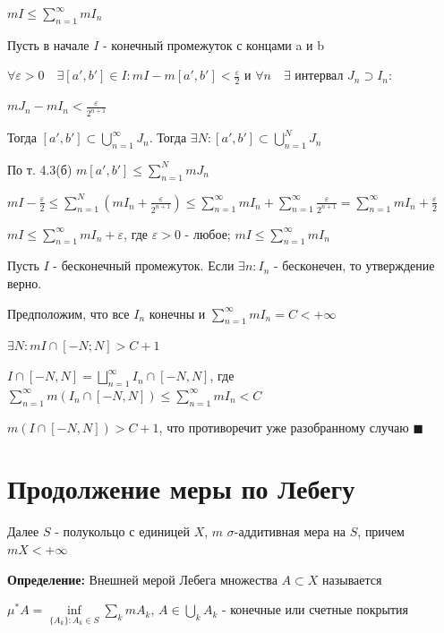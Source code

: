 \documentclass[a4paper]{report}
\begin{document}
$mI\le\sum\limits_{n=1}^\infty mI_n$

Пусть в начале $I$ - конечный промежуток с концами a и b

$\forall\varepsilon>0\quad\exists[a',b']\in I\colon mI-m[a',b']<\frac\varepsilon2$ и $\forall n\quad\exists$ интервал
$J_n\supset I_n\colon$

$mJ_n-mI_n<\displaystyle\frac{\varepsilon}{2^{n+1}}$

Тогда $[a',b']\subset\bigcup\limits_{n=1}^\infty J_n$. Тогда $\exists N\colon[a',b']\subset\bigcup\limits_{n=1}^N J_n$

По т. 4.3(б) $m[a',b']\le\sum\limits_{n=1}^N mJ_n$

$mI-\frac\varepsilon2\le\sum\limits_{n=1}^N\left(mI_n+\displaystyle\frac{\varepsilon}{2^{n+1}}\right)\le\sum\limits_{n=1}^\infty mI_n
+\sum\limits_{n=1}^\infty\displaystyle\frac{\varepsilon}{2^{n+1}}=\sum\limits_{n=1}^\infty mI_n+\frac\varepsilon2$

$mI\le\sum\limits_{n=1}^\infty mI_n+\varepsilon$, где $\varepsilon>0$ - любое; $mI\le\sum\limits_{n=1}^\infty mI_n$

Пусть $I$ - бесконечный промежуток. Если $\exists n\colon I_n$ - бесконечен, то утверждение верно.

Предположим, что все $I_n$ конечны и $\sum\limits_{n=1}^\infty mI_n=C<+\infty$

$\exists N\colon mI\cap[-N;N]>C+1$

$I\cap[-N,N]=\bigsqcup\limits_{n=1}^\infty I_n\cap[-N,N]$, где $\sum\limits_{n=1}^\infty m\left(I_n\cap[-N,N]\right)\le
\sum\limits_{n=1}^\infty mI_n<C$

 $m\left(I\cap[-N,N]\right)>C+1$, что противоречит уже разобранному случаю $\blacksquare$









\chapter{Продолжение меры по Лебегу}

Далее $S$ - полукольцо с единицей $X$, $m$ $\sigma$-аддитивная мера на $S$, причем $mX<+\infty$
\bigskip

\noindent\textbf{Определение:} Внешней мерой Лебега множества $A\subset X$ называется

$\mu^*A=\inf\limits_{\{A_k\}\colon A_k\in S}\sum\limits_k mA_k$, $A\in\bigcup\limits_k A_k$ - конечные или счетные покрытия
\end{document}
